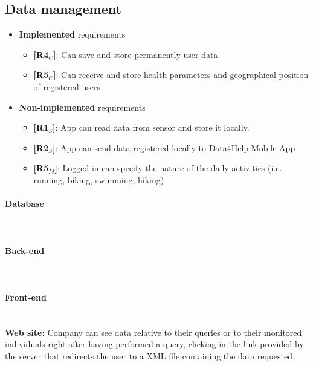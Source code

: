 \subsection{Data management}
\begin{itemize}
    \item \textbf{Implemented} requirements
        \begin{itemize}
    
        \item \textbf{[R4$_C$]}: Can save and store permanently user data
    \item \textbf{[R5$_C$]}: Can receive and store health parameters and geographical position of registered users

        \end{itemize}
    \item \textbf{Non-implemented} requirements
    \begin{itemize}
    \item \textbf{[R1$_S$]}: App can read data from sensor and store it locally.
      \item \textbf{[R2$_S$]}: App can send data registered locally to Data4Help Mobile App
      \item \textbf{[R5$_M$]}: Logged-in can specify the nature of the daily activities (i.e. running, biking, swimming, hiking)

        \end{itemize}
\end{itemize}

\paragraph{Database} \mbox{}\\  
\paragraph{Back-end} \mbox{}\\  
\paragraph{Front-end} \mbox{}\\
\textbf{Web site: }Company can see data relative to their queries or to their monitored individuals right after having performed a query, clicking in the link provided by the server that redirects the user to a XML file containing the data requested.


